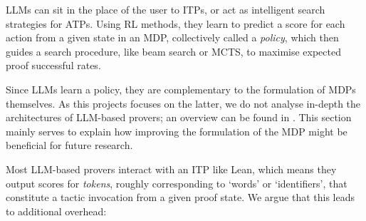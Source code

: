 \documentclass[twoside]{report}
\begin{document}
LLMs can sit in the place of the user to ITPs, or act as intelligent search strategies for ATPs. Using RL methods, they learn to predict a score for each action from a given state in an MDP, collectively called a \emph{policy}, which then guides a search procedure, like beam search or MCTS, to maximise expected proof successful rates.

Since LLMs learn a policy, they are complementary to the formulation of MDPs themselves. As this projects focuses on the latter, we do not analyse in-depth the architectures of LLM-based provers; an overview can be found in \cite{yang2024formal}. This section mainly serves to explain how improving the formulation of the MDP might be beneficial for future research.

Most LLM-based provers interact with an ITP like Lean, which means they output scores for \emph{tokens}, roughly corresponding to `words' or `identifiers', that constitute a tactic invocation from a given proof state. We argue that this leads to additional overhead:
\end{document}
